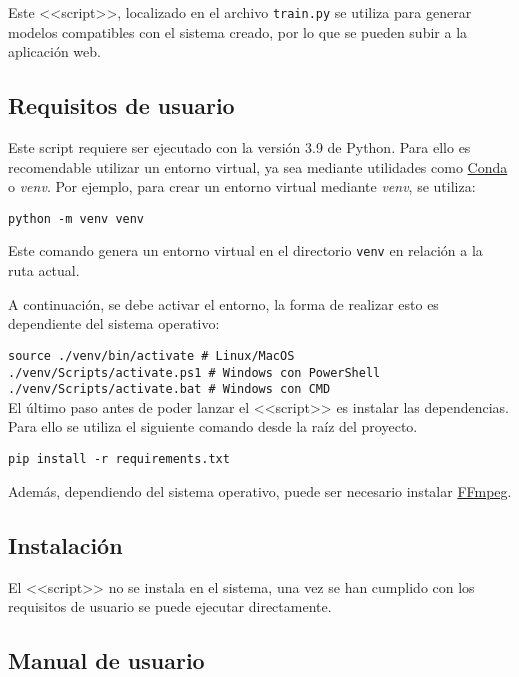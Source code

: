 Este <<script>>, localizado en el archivo \texttt{train.py} se utiliza para
generar modelos compatibles con el sistema creado, por lo que se pueden subir a
la aplicación web.

\subsection{Requisitos de usuario}

Este script requiere ser ejecutado con la versión 3.9 de Python. Para ello es
recomendable utilizar un entorno virtual, ya sea mediante utilidades como
\href{https://docs.conda.io/en/latest/}{Conda} o \textit{venv}. Por
ejemplo, para crear un entorno virtual mediante \textit{venv}, se utiliza:

\texttt{python -m venv venv}

Este comando genera un entorno virtual en el directorio \texttt{venv} en
relación a la ruta actual.

A continuación, se debe activar el entorno, la forma de realizar esto es
dependiente del sistema operativo:

\texttt{source ./venv/bin/activate \# Linux/MacOS} \\

\texttt{./venv/Scripts/activate.ps1 \# Windows con PowerShell} \\

\texttt{./venv/Scripts/activate.bat \# Windows con CMD} \\

El último paso antes de poder lanzar el <<script>> es instalar las dependencias.
Para ello se utiliza el siguiente comando desde la raíz del proyecto.

\texttt{pip install -r requirements.txt}

Además, dependiendo del sistema operativo, puede ser necesario instalar
\href{https://ffmpeg.org/}{FFmpeg}.

\subsection{Instalación}

El <<script>> no se instala en el sistema, una vez se han cumplido con los
requisitos de usuario se puede ejecutar directamente.

\subsection{Manual de usuario}


